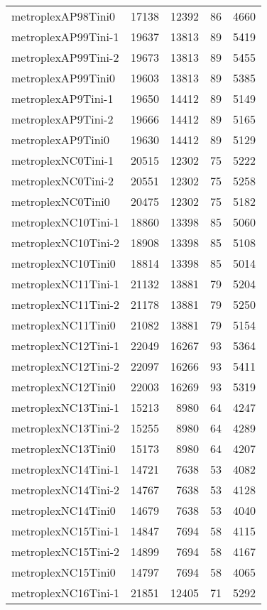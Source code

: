 \begin{longtable}{lrrrr}
metroplexAP98Tini0 & 17138 & 12392 & 86 & 4660 \\
metroplexAP99Tini-1 & 19637 & 13813 & 89 & 5419 \\
metroplexAP99Tini-2 & 19673 & 13813 & 89 & 5455 \\
metroplexAP99Tini0 & 19603 & 13813 & 89 & 5385 \\
metroplexAP9Tini-1 & 19650 & 14412 & 89 & 5149 \\
metroplexAP9Tini-2 & 19666 & 14412 & 89 & 5165 \\
metroplexAP9Tini0 & 19630 & 14412 & 89 & 5129 \\
metroplexNC0Tini-1 & 20515 & 12302 & 75 & 5222 \\
metroplexNC0Tini-2 & 20551 & 12302 & 75 & 5258 \\
metroplexNC0Tini0 & 20475 & 12302 & 75 & 5182 \\
metroplexNC10Tini-1 & 18860 & 13398 & 85 & 5060 \\
metroplexNC10Tini-2 & 18908 & 13398 & 85 & 5108 \\
metroplexNC10Tini0 & 18814 & 13398 & 85 & 5014 \\
metroplexNC11Tini-1 & 21132 & 13881 & 79 & 5204 \\
metroplexNC11Tini-2 & 21178 & 13881 & 79 & 5250 \\
metroplexNC11Tini0 & 21082 & 13881 & 79 & 5154 \\
metroplexNC12Tini-1 & 22049 & 16267 & 93 & 5364 \\
metroplexNC12Tini-2 & 22097 & 16266 & 93 & 5411 \\
metroplexNC12Tini0 & 22003 & 16269 & 93 & 5319 \\
metroplexNC13Tini-1 & 15213 & 8980 & 64 & 4247 \\
metroplexNC13Tini-2 & 15255 & 8980 & 64 & 4289 \\
metroplexNC13Tini0 & 15173 & 8980 & 64 & 4207 \\
metroplexNC14Tini-1 & 14721 & 7638 & 53 & 4082 \\
metroplexNC14Tini-2 & 14767 & 7638 & 53 & 4128 \\
metroplexNC14Tini0 & 14679 & 7638 & 53 & 4040 \\
metroplexNC15Tini-1 & 14847 & 7694 & 58 & 4115 \\
metroplexNC15Tini-2 & 14899 & 7694 & 58 & 4167 \\
metroplexNC15Tini0 & 14797 & 7694 & 58 & 4065 \\
metroplexNC16Tini-1 & 21851 & 12405 & 71 & 5292 \\

\end{longtable}
